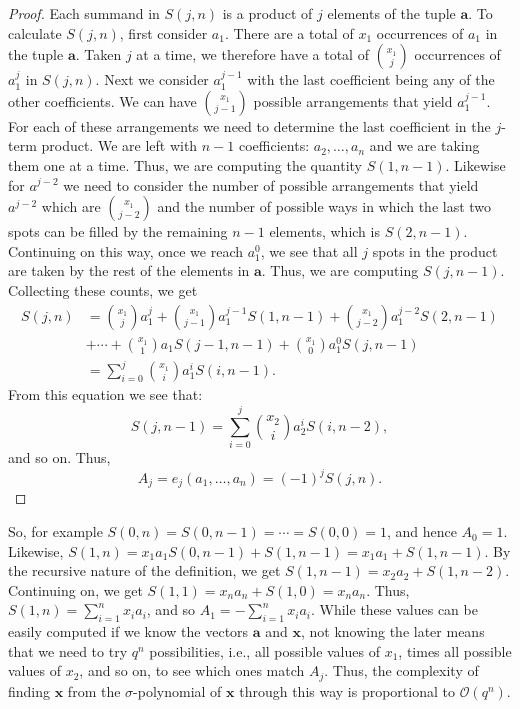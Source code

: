 \documentclass[pdflatex,sn-mathphys-num]{sn-jnl}
\theoremstyle{definition}
\newcommand{\vtr}[1]{\mathbf{#1}}
\begin{document}
\begin{proof}
Each summand in $S(j, n)$ is a product of $j$ elements of the tuple $\vtr{a}$. To calculate $S(j, n)$, first consider $a_1$. There are a total of $x_1$ occurrences of $a_1$ in the tuple $\vtr{a}$. Taken $j$ at a time, we therefore have a total of $\binom{x_1}{j}$ occurrences of $a_1^j$ in $S(j, n)$. Next we consider $a_1^{j-1}$ with the last coefficient being any of the other coefficients. We can have $\binom{x_1}{j - 1}$ possible arrangements that yield $a_1^{j-1}$. For each of these arrangements we need to determine the last coefficient in the $j$-term product. We are left with $n - 1$ coefficients: $a_2, \ldots, a_n$ and we are taking them one at a time. Thus, we are computing the quantity $S(1, n-1)$. Likewise for $a^{j-2}$ we need to consider the number of possible arrangements that yield $a^{j-2}$ which are $\binom{x_1}{j-2}$ and the number of possible ways in which the last two spots can be filled by the remaining $n-1$ elements, which is $S(2, n-1)$. Continuing on this way, once we reach $a_1^0$, we see that all $j$ spots in the product are taken by the rest of the elements in $\vtr{a}$. Thus, we are computing $S(j, n - 1)$. Collecting these counts, we get
\begin{align}
    S(j, n) &= \binom{x_1}{j}a_1^j + \binom{x_1}{j-1}a_1^{j-1}S(1, n - 1) + \binom{x_1}{j-2}a_1^{j-2} S(2, n - 1) \nonumber\\
    &+ \cdots + \binom{x_1}{1}a_1 S(j-1, n-1) + \binom{x_1}{0}a_1^0 S(j, n-1) \nonumber\\
    &= \sum_{i = 0}^j \binom{x_1}{i}a_1^i S(i, n-1) \nonumber.
\end{align}
From this equation we see that:
\[
S(j, n-1) = \sum_{i = 0}^j \binom{x_2}{i}a_2^i S(i, n-2),
\]
and so on. Thus, 
\[
A_j = e_j(a_1, \ldots, a_n) = (-1)^j S(j, n).
\]
\end{proof}


So, for example $S(0, n) = S(0, n-1) = \cdots = S(0, 0) = 1$, and hence $A_0 = 1$. Likewise, $S(1, n) = x_1 a_1 S(0, n-1) + S(1, n-1) = x_1a_1 + S(1, n - 1)$. By the recursive nature of the definition, we get $S(1, n -1) = x_2 a_2 + S(1, n -2)$. Continuing on, we get $S(1, 1) = x_na_n + S(1, 0) = x_n a_n$. Thus, $S(1, n) = \sum_{i=1}^n x_i a_i$, and so $A_1 = - \sum_{i=1}^n x_i a_i$. While these values can be easily computed if we know the vectors $\vtr{a}$ and $\vtr{x}$, not knowing the later means that we need to try $q^n$ possibilities, i.e., all possible values of $x_1$, times all possible values of $x_2$, and so on, to see which ones match $A_j$. Thus, the complexity of finding $\vtr{x}$ from the $\sigma$-polynomial of $\vtr{x}$ through this way is proportional to $\mathcal{O}(q^n)$. 
\end{document}
